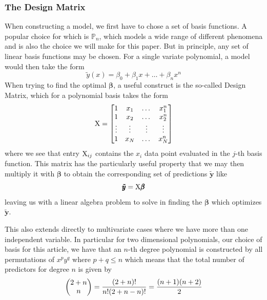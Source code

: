 \documentclass[reprint, english, nofootinbib]{revtex4-2}
\begin{document}
        \subsubsection{The Design Matrix}
            \noindent
            When constructing a model, we first have to chose a set of basis functions. A popular choice for which is $\mathbb P_n$, which models a wide range of different phenomena and is also the choice we will make for this paper. But in principle, any set of linear basis functions may be chosen.
            For a single variate polynomial, a model would then take the form
            \begin{equation}
                \tilde y (x) = \beta_0 + \beta_1 x+ \dots + \beta_n x^n
            \end{equation}
            When trying to find the optimal $\pmb \beta$, a useful construct is the so-called Design Matrix, which for a polynomial basis takes the form
            \begin{equation}
                \textup{X} = \qty[
                \begin{matrix}
                    1 & x_1 & \dots & x_1^n \\
                    1 & x_2 & \dots & x_2^n \\
                    \vdots & \vdots & \vdots & \vdots \\
                    1 & x_N & \dots & x_N^n
                \end{matrix}
                ]
            \end{equation}
            where we see that entry $\textup{X}_{ij}$ contains the $x_i$ data point evaluated in the $j$-th basis function. This matrix has the particularly useful property that we may then multiply it with $\pmb \beta$ to obtain the corresponding set of predictions $\pmb{\tilde y}$ like
            \begin{equation}
                \pmb{\tilde y} = \textup{X}\pmb \beta
            \end{equation}
            leaving us with a linear algebra problem to solve in finding the $\pmb\beta$ which optimizes $\pmb{\tilde y}$.

            This also extends directly to multivariate cases where we have more than one independent variable. In particular for two dimensional polynomials, our choice of basis for this article, we have that an $n$-th degree polynomial is constructed by all permutations of $x^p y^q$ where $p+q \leq n$ which means that the total number of predictors for degree $n$ is given by
            \begin{equation}
                \qty(
                \begin{matrix}
                    2 + n \\ n
                \end{matrix}
                )
                =\frac{(2+n)!}{n!(2+n-n)!} = \frac{(n+1)(n+2)}{2}
            \end{equation}
\end{document}
